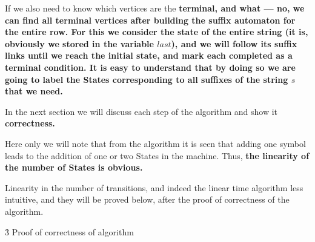 If we also need to know which vertices are the \bf{terminal}, and what --- no, we can find all terminal vertices after building the suffix automaton for the entire row. For this we consider the state of the entire string (it is, obviously we stored in the variable $last$), and we will follow its suffix links until we reach the initial state, and mark each completed as a terminal condition. It is easy to understand that by doing so we are going to label the States corresponding to all suffixes of the string $s$ that we need.

In the next section we will discuss each step of the algorithm and show it \bf{correctness}.

Here only we will note that from the algorithm it is seen that adding one symbol leads to the addition of one or two States in the machine. Thus, \bf{the linearity of the number of States} is obvious.

Linearity in the number of transitions, and indeed the linear time algorithm less intuitive, and they will be proved below, after the proof of correctness of the algorithm.


\h3{ Proof of correctness of algorithm }

